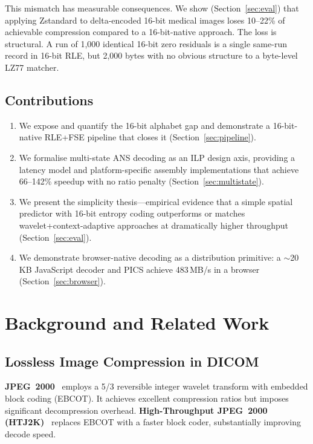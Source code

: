\documentclass[10pt,twocolumn]{article}
\begin{document}
This mismatch has measurable consequences. We show (Section~\ref{sec:eval}) that
applying Zstandard to delta-encoded 16-bit medical images loses 10--22\% of
achievable compression compared to a 16-bit-native approach. The loss is
structural. A run of 1,000 identical 16-bit zero residuals is a single same-run
record in 16-bit RLE, but 2,000 bytes with no obvious structure to a byte-level
LZ77 matcher.

\subsection*{Contributions}

\begin{enumerate}
  \item We expose and quantify the 16-bit alphabet gap and demonstrate a
  16-bit-native RLE+FSE pipeline that closes it (Section~\ref{sec:pipeline}).
  \item We formalise multi-state ANS decoding as an ILP design axis, providing a
  latency model and platform-specific assembly implementations that achieve
  66--142\% speedup with no ratio penalty (Section~\ref{sec:multistate}).
  \item We present the simplicity thesis---empirical evidence that a simple
  spatial predictor with 16-bit entropy coding outperforms or matches
  wavelet+context-adaptive approaches at dramatically higher throughput
  (Section~\ref{sec:eval}).
  \item We demonstrate browser-native decoding as a distribution primitive: a
  $\sim$20\,KB JavaScript decoder and PICS achieve 483\,MB/s in a browser
  (Section~\ref{sec:browser}).
\end{enumerate}

\section{Background and Related Work}
\label{sec:background}

\subsection{Lossless Image Compression in DICOM}

\textbf{JPEG~2000}~\cite{taubman2002} employs a 5/3 reversible integer wavelet
transform with embedded block coding (EBCOT). It achieves excellent compression
ratios but imposes significant decompression overhead. \textbf{High-Throughput
JPEG~2000 (HTJ2K)}~\cite{htj2k2019} replaces EBCOT with a faster block coder,
substantially improving decode speed.
\end{document}
